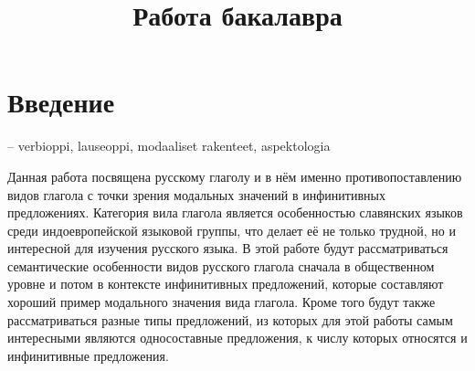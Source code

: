 \documentclass{article}
\title{Работа бакалавра}
\begin{document}


\tableofcontents

\pagebreak


\section{Введение}

-- verbioppi, lauseoppi, modaaliset rakenteet, aspektologia



Данная работа посвящена русскому глаголу и в нём именно противопоставлению видов глагола с точки зрения модальных значений в инфинитивных предложениях. Категория вила глагола является особенностью славянских языков среди индоевропейской языковой группы, что делает её не только трудной, но и интересной для изучения русского языка. В этой работе будут рассматриваться семантические особенности видов русского глагола сначала в общественном уровне и потом в контексте инфинитивных предложений, которые составляют хороший пример модального значения вида глагола. Кроме того будут также рассматриваться разные типы предложений, из которых для этой работы самым интересными являются односоставные предложения, к числу которых относятся и инфинитивные предложения.
\end{document}

